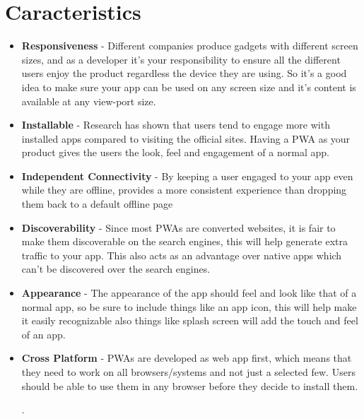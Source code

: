 \documentclass[12pt]{article}
\begin{document}
\section{Caracteristics}
\begin{itemize}
    \item \textbf{Responsiveness} - Different companies produce gadgets with different screen sizes, and as a developer it's your responsibility to ensure all the different users enjoy the product regardless the device they are using. So it's a good idea to make sure your app can be used on any screen size and it's content is available at any view-port size.
    \item \textbf{Installable} - Research has shown that users tend to engage more with installed apps compared to visiting the official sites. Having a PWA as your product gives the users the look, feel and engagement of a normal app.
    \item \textbf{Independent Connectivity} - By keeping a user engaged to your app even while they are offline, provides a more consistent experience than dropping them back to a default offline page
    \item \textbf{Discoverability} - Since most PWAs are converted websites, it is fair to make them discoverable on the search engines, this will help generate extra traffic to your app. This also acts as an advantage over native apps which can't be discovered over the search engines.
    \item \textbf{Appearance} - The appearance of the app should feel and look like that of a normal app, so be sure to include things like an app icon, this will help make it easily recognizable also things like splash screen will add the touch and feel of an app.
    \item \textbf{Cross Platform} - PWAs are developed as web app first, which means that they need to work on all browsers/systems and not just a selected few. Users should be able to use them in any browser before they decide to install them.
    
    \citep{PWA}.
\end{itemize}
\end{document}
